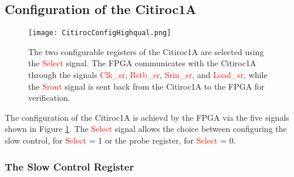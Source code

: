 \subsection{Configuration of the Citiroc1A}\label{sec:configuration}
\begin{figure}[h]
    \centering
    \texttt{[image: CitirocConfigHighqual.png]}
    \caption{The two configurable registers of the Citiroc1A are selected using the \textcolor{red}{Select} signal. 
    The FPGA communicates with the Citiroc1A through the signals \textcolor{red}{Clk\_sr}, \textcolor{red}{Rstb\_sr}, 
    \textcolor{red}{Srin\_sr}, and \textcolor{red}{Load\_sr}, while the \textcolor{red}{Srout} signal is sent back from the Citiroc1A to the FPGA for verification.\autocite{datasheetCITIROC}}
    \label{fig:CITIROC1A_config}
\end{figure}
The configuration of the Citiroc1A is achievd by the FPGA via the five signals shown in Figure \ref{fig:CITIROC1A_config}.
The \textcolor{red}{Select} signal allows the choice between configuring the slow control, for \textcolor{red}{Select} = 1  or the probe register, for \textcolor{red}{Select} = 0.\autocite{datasheetCITIROC}

\subsubsection{The Slow Control Register}

